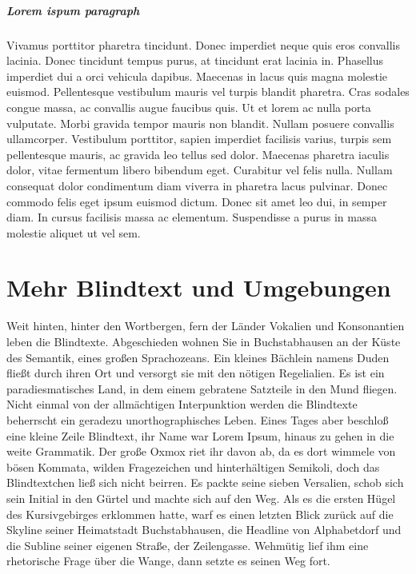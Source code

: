 \documentclass[a4paper,parskip=half,oneside]{scrbook}
\begin{document}
\paragraph{Lorem ispum paragraph}
Vivamus porttitor pharetra tincidunt. Donec imperdiet neque quis eros convallis lacinia. Donec tincidunt tempus purus, at tincidunt erat lacinia in. Phasellus imperdiet dui a orci vehicula dapibus. Maecenas in lacus quis magna molestie euismod. Pellentesque vestibulum mauris vel turpis blandit pharetra. Cras sodales congue massa, ac convallis augue faucibus quis. Ut et lorem ac nulla porta vulputate. Morbi gravida tempor mauris non blandit. Nullam posuere convallis ullamcorper. Vestibulum porttitor, sapien imperdiet facilisis varius, turpis sem pellentesque mauris, ac gravida leo tellus sed dolor. Maecenas pharetra iaculis dolor, vitae fermentum libero bibendum eget. Curabitur vel felis nulla. Nullam consequat dolor condimentum diam viverra in pharetra lacus pulvinar. Donec commodo felis eget ipsum euismod dictum. Donec sit amet leo dui, in semper diam. In cursus facilisis massa ac elementum. Suspendisse a purus in massa molestie aliquet ut vel sem.  \chapter{Mehr Blindtext und Umgebungen} Weit hinten, hinter den Wortbergen, fern der L\"ander Vokalien und Konsonantien leben die Blindtexte. Abgeschieden wohnen Sie in Buchstabhausen an der Küste des Semantik, eines großen Sprachozeans. Ein kleines B\"achlein namens Duden fließt durch ihren Ort und versorgt sie mit den nötigen Regelialien. Es ist ein paradiesmatisches Land, in dem einem gebratene Satzteile in den Mund fliegen. Nicht einmal von der allm\"achtigen Interpunktion werden die Blindtexte beherrscht ein geradezu unorthographisches Leben. Eines Tages aber beschloß eine kleine Zeile Blindtext, ihr Name war Lorem Ipsum, hinaus zu gehen in die weite Grammatik. Der große Oxmox riet ihr davon ab, da es dort wimmele von bösen Kommata, wilden Fragezeichen und hinterh\"altigen Semikoli, doch das Blindtextchen ließ sich nicht beirren. Es packte seine sieben Versalien, schob sich sein Initial in den Gürtel und machte sich auf den Weg. Als es die ersten Hügel des Kursivgebirges erklommen hatte, warf es einen letzten Blick zurück auf die Skyline seiner Heimatstadt Buchstabhausen, die Headline von Alphabetdorf und die Subline seiner eigenen Straße, der Zeilengasse. Wehmütig lief ihm eine rhetorische Frage über die Wange, dann setzte es seinen Weg fort.
\end{document}
